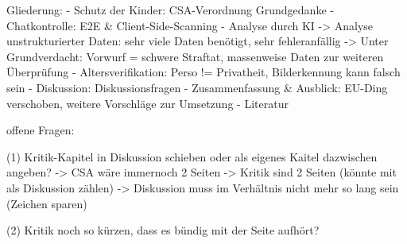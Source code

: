 Gliederung:
- Schutz der Kinder: CSA-Verordnung Grundgedanke
- Chatkontrolle: E2E \& Client-Side-Scanning
- Analyse durch KI
-> Analyse unstrukturierter Daten: sehr viele Daten benötigt, sehr fehleranfällig
-> Unter Grundverdacht: Vorwurf = schwere Straftat, massenweise Daten zur weiteren Überprüfung
- Altersverifikation: Perso != Privatheit, Bilderkennung kann falsch sein
- Diskussion: Diskussionsfragen
- Zusammenfassung \& Ausblick: EU-Ding verschoben, weitere Vorschläge zur Umsetzung
- Literatur

offene Fragen:

(1) Kritik-Kapitel in Diskussion schieben oder als eigenes Kaitel dazwischen angeben?
 -> CSA wäre immernoch 2 Seiten
 -> Kritik sind 2 Seiten (könnte mit als Diskussion zählen)
 -> Diskussion muss im Verhältnis nicht mehr so lang sein (Zeichen sparen)
 
(2) Kritik noch so kürzen, dass es bündig mit der Seite aufhört?